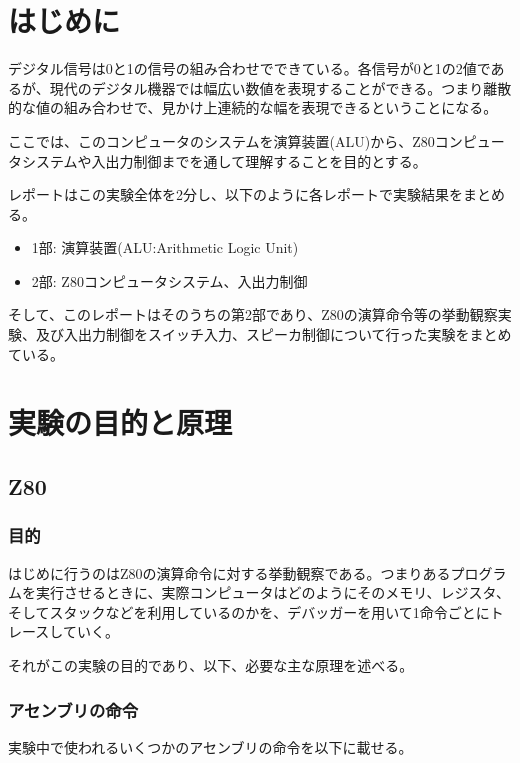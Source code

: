 \documentclass[11pt,a4j]{jsarticle}
\title{}
\author{1413176 三村幸祐}
\date{ \, }
\begin{document}
  
 \tableofcontents \newpage
  
  
 \section{はじめに}
  デジタル信号は0と1の信号の組み合わせでできている。各信号が0と1の2値であるが、現代のデジタル機器では幅広い数値を表現することができる。つまり離散的な値の組み合わせで、見かけ上連続的な幅を表現できるということになる。
  
  ここでは、このコンピュータのシステムを演算装置(ALU)から、Z80コンピュータシステムや入出力制御までを通して理解することを目的とする。
  
  レポートはこの実験全体を2分し、以下のように各レポートで実験結果をまとめる。
  \begin{itemize}
  \item 1部: 演算装置(ALU:Arithmetic Logic Unit)
  \item 2部: Z80コンピュータシステム、入出力制御
  \end{itemize}
  
  そして、このレポートはそのうちの第2部であり、Z80の演算命令等の挙動観察実験、及び入出力制御をスイッチ入力、スピーカ制御について行った実験をまとめている。
  
  
 \section{実験の目的と原理}
  
  \subsection{Z80}
   
   \subsubsection{目的}
   はじめに行うのはZ80の演算命令に対する挙動観察である。つまりあるプログラムを実行させるときに、実際コンピュータはどのようにそのメモリ、レジスタ、そしてスタックなどを利用しているのかを、デバッガーを用いて1命令ごとにトレースしていく。
   
   それがこの実験の目的であり、以下、必要な主な原理を述べる。
   
   \subsubsection{アセンブリの命令}
   実験中で使われるいくつかのアセンブリの命令を以下に載せる。
   
\end{document}

